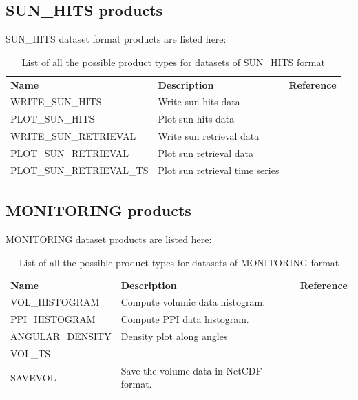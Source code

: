\documentclass[a4paper,11pt,pdftex,twoside]{scrartcl}
\renewcommand{\bf}{\normalfont \bfseries}
\begin{document}
{{{\subsection{SUN\_HITS products}
SUN\_HITS dataset format products are listed here:



\begin{table}[H]
\begin{tabularx}{\textwidth}{lXl}
{\bf Name} & {\bf Description} & {\bf Reference}\\
WRITE\_SUN\_HITS & Write sun hits data &  \\
PLOT\_SUN\_HITS & Plot sun hits data &  \\
WRITE\_SUN\_RETRIEVAL & Write sun retrieval data &  \\
PLOT\_SUN\_RETRIEVAL & Plot sun retrieval data &  \\
PLOT\_SUN\_RETRIEVAL\_TS & Plot sun retrieval time series &  \\

\end{tabularx}
\caption{List of all the possible product types for datasets of SUN\_HITS format}
\label{tab_products_SUN_HITS}
\end{table}

\subsection{MONITORING products}
MONITORING dataset products are listed here:

\begin{table}[H]
\begin{tabularx}{\textwidth}{lXl}
{\bf Name} & {\bf Description} & {\bf Reference}\\
VOL\_HISTOGRAM & Compute volumic data histogram. &  \\
PPI\_HISTOGRAM & Compute PPI data histogram. &  \\
ANGULAR\_DENSITY & Density plot along angles &  \\
VOL\_TS & & \\
SAVEVOL & Save the volume data in NetCDF format. & \\

\end{tabularx}
\caption{List of all the possible product types for datasets of MONITORING format}
\label{tab_products_MONITORING}
\end{table}

}}}
\end{document}
